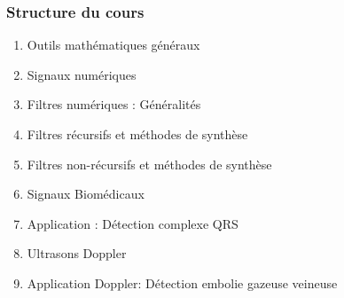 \documentclass{beamer}
\begin{document}
\begin{frame} 
\frametitle{Structure du cours}
\vspace{0.3cm}
\begin{enumerate}
\item Outils mathématiques généraux  
\vspace{0.3cm}
\item Signaux numériques  
\vspace{0.3cm}
\item Filtres numériques : Généralités 
\vspace{0.3cm}
\item Filtres récursifs et méthodes de synthèse
\vspace{0.3cm}
\item Filtres non-récursifs et méthodes de synthèse
\vspace{0.3cm}
\item Signaux Biomédicaux
\vspace{0.3cm}
\item Application : Détection complexe QRS
\vspace{0.3cm}
\item Ultrasons Doppler
\vspace{0.3cm}
\item Application Doppler: Détection embolie gazeuse veineuse
\end{enumerate}
\end{frame} 
\end{document}
